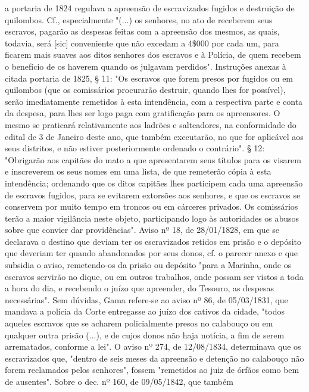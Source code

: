 {  a portaria de 1824 regulava a apreensão de escravizados fugidos e
  destruição de quilombos. Cf., especialmente "(...) os senhores, no ato
  de receberem seus escravos, pagarão as despesas feitas com a apreensão
  dos mesmos, as quais, todavia, será {[}sic{]} conveniente que não
  excedam a 4\$000 por cada um, para ficarem mais suaves aos ditos
  senhores dos escravos e à Polícia, de quem recebem o benefício de os
  haverem quando os julgavam perdidos". Instruções anexas à citada
  portaria de 1825, § 11: "Os escravos que forem presos por fugidos ou
  em quilombos (que os comissários procurarão destruir, quando lhes for
  possível), serão imediatamente remetidos à esta intendência, com a
  respectiva parte e conta da despesa, para lhes ser logo paga com
  gratificação para os apreensores. O mesmo se praticará relativamente
  aos ladrões e salteadores, na conformidade do edital de 3 de Janeiro
  deste ano, que também executarão, no que for aplicável aos seus
  distritos, e não estiver posteriormente ordenado o contrário". § 12:
  "Obrigarão aos capitães do mato a que apresentarem seus títulos para
  os visarem e inscreverem os seus nomes em uma lista, de que remeterão
  cópia à esta intendência; ordenando que os ditos capitães lhes
  participem cada uma apreensão de escravos fugidos, para se evitarem
  extorsões aos senhores, e que os escravos se conservem por muito tempo
  em troncos ou em cárceres privados. Os comissários terão a maior
  vigilância neste objeto, participando logo às autoridades os abusos
  sobre que convier dar providências". Aviso nº 18, de 28/01/1828, em
  que se declarava o destino que deviam ter os escravizados retidos em
  prisão e o depósito que deveriam ter quando abandonados por seus
  donos, cf. o parecer anexo e que subsidia o aviso, remetendo-os da
  prisão ou depósito "para a Marinha, onde os escravos servirão no
  dique, ou em outros trabalhos, onde possam ser vistos a toda a hora do
  dia, e recebendo o juízo que apreender, do Tesouro, as despesas
  necessárias". Sem dúvidas, Gama refere-se ao aviso nº 86, de
  05/03/1831, que mandava a polícia da Corte entregasse ao juízo dos
  cativos da cidade, "todos aqueles escravos que se acharem
  policialmente presos no calabouço ou em qualquer outra prisão (...), e
  de cujos donos não haja notícia, a fim de serem arrematados, conforme
  a lei". O aviso nº 274, de 12/08/1834, determinava que os escravizados
  que, "dentro de seis meses da apreensão e detenção no calabouço não
  forem reclamados pelos senhores", fossem "remetidos ao juiz de órfãos
  como bem de ausentes". Sobre o dec. nº 160, de 09/05/1842, que também
}
